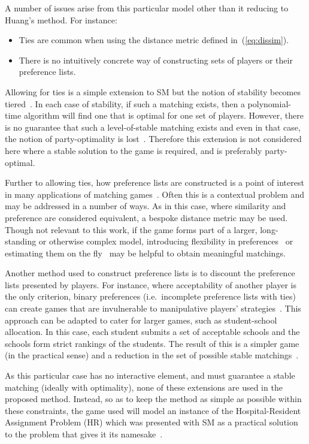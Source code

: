 A number of issues arise from this particular model other than it reducing to
Huang's method. For instance:
\begin{itemize}
    \item Ties are common when using the distance metric defined
        in~(\ref{eq:dissim}).
    \item There is no intuitively concrete way of constructing sets of players
        or their preference lists.
\end{itemize}

Allowing for ties is a simple extension to SM but the notion of stability
becomes tiered~\cite{Iwama2016,Iwama1999}. In each case of stability, if such a
matching exists, then a polynomial-time algorithm will find one that is optimal
for one set of players. However, there is no guarantee that such a
level-of-stable matching exists and even in that case, the notion of
party-optimality is lost~\cite{Erdil2017}. Therefore this extension is not
considered here where a stable solution to the game is required, and is
preferably party-optimal.

Further to allowing ties, how preference lists are constructed is a point of
interest in many applications of matching games~\cite{Iwama2008,Manlove2002}.
Often this is a contextual problem and may be addressed in a number of ways. As
in this case, where similarity and preference are considered equivalent, a
bespoke distance metric may be used. Though not relevant to this work, if the
game forms part of a larger, long-standing or otherwise complex model,
introducing flexibility in preferences~\cite{Agarwal2017,Menzel2015} or
estimating them on the fly~\cite{Rastegari2016} may be helpful to obtain
meaningful matchings.

Another method used to construct preference lists is to discount the preference
lists presented by players. For instance, where acceptability of another player
is the only criterion, binary preferences (i.e.\ incomplete preference lists
with ties) can create games that are invulnerable to manipulative players'
strategies~\cite{Bogomolnaia2004}. This approach can be adapted to cater for
larger games, such as student-school allocation. In this case, each student
submits a set of acceptable schools and the schools form strict rankings of the
students. The result of this is a simpler game (in the practical sense) and a
reduction in the set of possible stable
matchings~\cite{Haeringer2014,Haeringer2019}.

As this particular case has no interactive element, and must guarantee a stable
matching (ideally with optimality), none of these extensions are used in the
proposed method. Instead, so as to keep the method as simple as possible within
these constraints, the game used will model an instance of the Hospital-Resident
Assignment Problem (HR) which was presented with SM as a practical solution to
the problem that gives it its namesake~\cite{Gale1962}.

